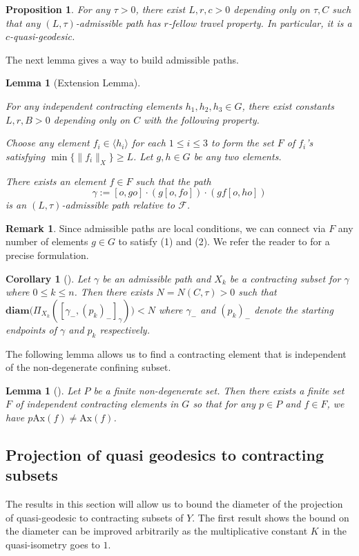 \documentclass{amsart}
\numberwithin{thm}{section}
\numberwithin{figure}{section}
\newtheorem{lem}[thm]{Lemma}
\newtheorem{cor}[thm]{Corollary}
\newtheorem{prop}[thm]{Proposition}
\theoremstyle{definition}
\newtheorem{remark}[thm]{Remark}
\theoremstyle{definition}
\theoremstyle{remark}
\newcommand{\f}{\mathscr F}
\newcommand{\ax}{\mathrm{Ax}}
\newcommand{\diam }[1]{{\textbf{diam}\big(#1\big)}}
\numberwithin{equation}{section}
\theoremstyle{plain}
\begin{document}
\begin{prop}\label{admisProp}\cite{Yan14:GrowthTight}
For any $\tau>0$, there exist $L,  r, c>0$ depending only on $\tau,C$ such that  any $(L, \tau)$-admissible path   has $r$-fellow travel property. In particular, it is a $c$-quasi-geodesic.
\end{prop}

The next lemma gives a way to build admissible paths.
\begin{lem}[Extension Lemma]\label{extend3}

{For any independent contracting elements $h_{1}, h_{2}, h_{3} \in G$,} there exist constants  $L, r, B>0$ depending only on $C$ with the following property.  

Choose any element $f_i\in \langle h_i\rangle$ for each $1\le i\le 3$  to form the set $F$ of $f_i$'s satisfying $\min \{\| f_i \|_X \} \geq L$. Let $g,h\in G$ be any two elements.

There exists an element $f \in F$ such that   the path  $$\gamma:=[o, go]\cdot(g[o, fo])\cdot(gf[o,ho])$$ is an $(L, \tau)$-admissible path relative to $\f$. 
\end{lem}


\begin{remark} 
Since admissible paths are local conditions, we can connect via $F$  any number of elements  $g\in G$ to satisfy (1) and (2). We refer the reader to \cite{Yan14:GrowthTight} for a precise formulation.
\end{remark}

\begin{cor}[{\cite[Corollary~3.9]{Yan14:GrowthTight}}]\label{ProjMidSet}
    Let $\gamma$ be an admissible path and $X_k$ be a contracting subset for $\gamma$ where $0\le k\le n$. Then there exists $N = N(C, \tau) > 0$ such that $\diam{\Pi_{X_k}([\gamma_{-}, (p_k)_{-}]_{\gamma})} < N$ where $\gamma_{-}$ and $(p_k)_{-}$ denote the starting endpoints of $\gamma$ and $p_k$ respectively.
\end{cor}
The following lemma allows us to find a contracting element that is independent of the non-degenerate confining subset.
\begin{lem}[\cite{DY24:GrowthTight}]\label{lem:indepsetF}
    Let $P$  be a finite non-degenerate set. Then there exists a finite set $F$ of independent contracting elements in $G$ so that for any $p\in P$ and $f\in F$, we have $p \ax(f)\ne \ax(f)$.      
\end{lem}
\subsection{Projection of quasi geodesics to contracting subsets}
\label{subsec:projection}
The results in this section will allow us to bound the diameter of the projection of quasi-geodesic to contracting subsets of $Y$. 
The first result shows the bound on the diameter can be improved arbitrarily as the multiplicative constant $K$ in the quasi-isometry goes to $1$.
\end{document}
